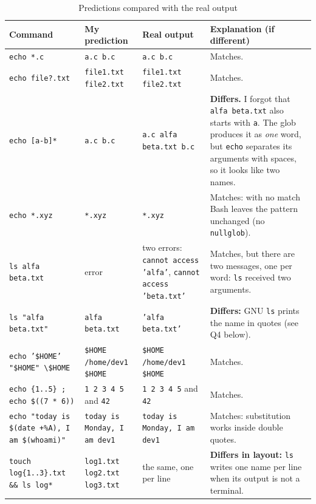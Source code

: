 \documentclass{assets/utmreport}
\begin{document}
\begin{table}[H]
\centering\small\setlength{\tabcolsep}{3pt}
\begin{tabular}{>{\raggedright\arraybackslash}p{3.6cm}>{\raggedright\arraybackslash}p{3.1cm}>{\raggedright\arraybackslash}p{3.3cm}>{\raggedright\arraybackslash}p{5.0cm}}
\toprule
\textbf{Command} & \textbf{My prediction} & \textbf{Real output} & \textbf{Explanation (if different)} \\
\midrule
\texttt{echo *.c} & \texttt{a.c b.c} & \texttt{a.c b.c} & Matches. \\
\texttt{echo file?.txt} & \texttt{file1.txt file2.txt} & \texttt{file1.txt file2.txt} & Matches. \\
\texttt{echo [a-b]*} & \texttt{a.c b.c} & \texttt{a.c alfa beta.txt b.c} & \textbf{Differs.} I forgot that \texttt{alfa beta.txt} also starts with \texttt{a}. The glob produces it as \emph{one} word, but \texttt{echo} separates its arguments with spaces, so it looks like two names. \\
\texttt{echo *.xyz} & \texttt{*.xyz} & \texttt{*.xyz} & Matches: with no match Bash leaves the pattern unchanged (no \texttt{nullglob}). \\
\texttt{ls alfa beta.txt} & error & two errors: \texttt{cannot access 'alfa'}, \texttt{cannot access 'beta.txt'} & Matches, but there are two messages, one per word: \texttt{ls} received two arguments. \\
\texttt{ls "alfa beta.txt"} & \texttt{alfa beta.txt} & \texttt{'alfa beta.txt'} & \textbf{Differs:} GNU \texttt{ls} prints the name in quotes (see Q4 below). \\
\texttt{echo '\$HOME' "\$HOME" \textbackslash\$HOME} & \texttt{\$HOME /home/dev1 \$HOME} & \texttt{\$HOME /home/dev1 \$HOME} & Matches. \\
\texttt{echo \{1..5\} ; echo \$((7 * 6))} & \texttt{1 2 3 4 5} and \texttt{42} & \texttt{1 2 3 4 5} and \texttt{42} & Matches. \\
\texttt{echo "today is \$(date +\%A), I am \$(whoami)"} & \texttt{today is Monday, I am dev1} & \texttt{today is Monday, I am dev1} & Matches: substitution works inside double quotes. \\
\texttt{touch log\{1..3\}.txt \&\& ls log*} & \texttt{log1.txt log2.txt log3.txt} & the same, one per line & \textbf{Differs in layout:} \texttt{ls} writes one name per line when its output is not a terminal. \\
\bottomrule
\end{tabular}
\caption{Predictions compared with the real output}
\label{tab:predictions}
\end{table}
\end{document}
